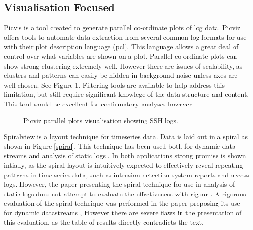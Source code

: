 \subsection{Visualisation Focused}

Picvis \cite{tricaud2008picviz} is a tool created to generate parallel co-ordinate plots of log data. Picviz offers tools to automate data extraction from several common log formats for use with their plot description language (pcl). This language allows a great deal of control over what variables are shown on a plot. Parallel co-ordinate plots can show strong clustering extremely well. However there are issues of scalability, as clusters and patterns can easily be hidden in background noise unless axes are well chosen. See Figure \ref{parallel}. Filtering tools are available to help address this limitation, but still require significant knowlege of the data structure and content. This tool would be excellent for confirmatory analyses however. 

\begin{figure}[tbh]
\caption{\protect\label{parallel} Picviz parallel plots visualisation \cite{tricaud2008picviz} showing SSH logs.}
\end{figure}

Spiralview \cite{bertini2007spiralview} is a layout technique for timeseries data. Data is laid out in a spiral as shown in Figure \ref{spiral}. This technique has been used both for dynamic data streams \cite{chin2009visual} and analysis of static logs \cite{bertini2007spiralview}. In both applications strong promise is shown intially, as the spiral layout is intuitively expected to effectively reveal repeating patterns in time series data, such as intrusion detection system reports and access logs. However, the paper presenting the spiral technique for use in analysis of static logs does not attempt to evaluate the effectiveness with rigour \cite{bertini2007spiralview}. A rigorous evaluation of the spiral technique was performed in the paper proposing its use for dynamic datastreams \cite{chin2009visual}, However there are severe flaws in the presentation of this evaluation, as the table of results directly contradicts the text. 

